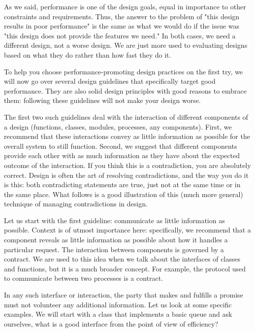 
As we said, performance is one of the design goals, equal in importance to other constraints and requirements. Thus, the answer to the problem of "this design results in poor performance" is the same as what we would do if the issue was "this design does not provide the features we need." In both cases, we need a different design, not a worse design. We are just more used to evaluating designs based on what they do rather than how fast they do it.

To help you choose performance-promoting design practices on the first try, we will now go over several design guidelines that specifically target good performance. They are also solid design principles with good reasons to embrace them: following these guidelines will not make your design worse. 

The first two such guidelines deal with the interaction of different components of a design (functions, classes, modules, processes, any components). First, we recommend that these interactions convey as little information as possible for the overall system to still function. Second, we suggest that different components provide each other with as much information as they have about the expected outcome of the interaction. If you think this is a contradiction, you are absolutely correct. Design is often the art of resolving contradictions, and the way you do it is this: both contradicting statements are true, just not at the same time or in the same place. What follows is a good illustration of this (much more general) technique of managing contradictions in design.


Let us start with the first guideline: communicate as little information as possible. Context is of utmost importance here: specifically, we recommend that a component reveals as little information as possible about how it handles a particular request. The interaction between components is governed by a contract. We are used to this idea when we talk about the interfaces of classes and functions, but it is a much broader concept. For example, the protocol used to communicate between two processes is a contract. 

In any such interface or interaction, the party that makes and fulfills a promise must not volunteer any additional information. Let us look at some specific examples. We will start with a class that implements a basic queue and ask ourselves, what is a good interface from the point of view of efficiency?

